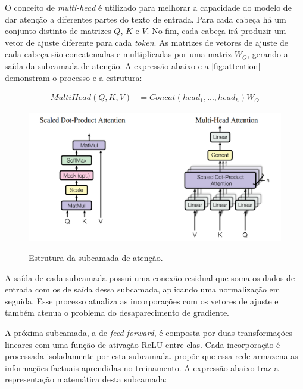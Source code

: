 O conceito de \textit{multi-head} é utilizado para melhorar a capacidade do modelo de dar atenção a diferentes partes
do texto de entrada. Para cada cabeça há um conjunto distinto de matrizes \begin{math}Q\end{math}, \begin{math}K\end{math} e \begin{math}V\end{math}. No fim, cada cabeça irá produzir um vetor de ajuste diferente
para cada \textit{token}. As matrizes de vetores de ajuste de cada cabeça são concatenadas e multiplicadas por uma matriz \begin{math}W_O\end{math}, gerando a saída da
subcamada de atenção. A expressão abaixo e a \autoref{fig:attention} demonstram o processo e a estrutura:

\begin{align*}
    MultiHead(Q, K, V) & = Concat(head_1,...,head_h)W_O
\end{align*}

\begin{figure}[ht]
    \centering
    \caption{\small Estrutura da subcamada de atenção.}
    \includegraphics[width=0.7\columnwidth,keepaspectratio]{images/attention.png}
    \label{fig:attention}
\end{figure}

A saída de cada subcamada possui uma conexão residual que soma os dados de entrada com os de saída dessa subcamada,
aplicando uma normalização em seguida. Esse processo atualiza as incorporações com os vetores de ajuste e também atenua
o problema do desaparecimento de gradiente.

A próxima subcamada, a de \textit{feed-forward}, é composta por duas transformações lineares com uma função de ativação
\ac{ReLU} entre elas. Cada incorporação é processada isoladamente por esta subcamada. \textcite{feed_forward_knowledge}
propõe que essa rede armazena as informações factuais aprendidas no treinamento. A expressão abaixo traz a
representação matemática desta subcamada:

